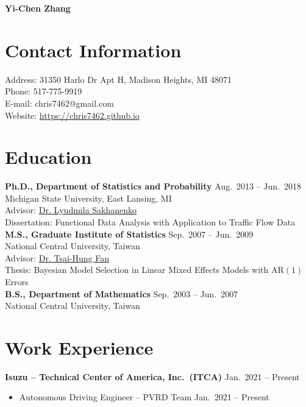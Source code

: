 \documentclass[a4paper,10pt,dvipdfmx]{article}
\begin{document}
\begin{center}
  {\huge \textbf{Yi-Chen Zhang}}
\end{center}

\section*{Contact Information}
\indent Address: 31350 Harlo Dr Apt H, Madison Heights, MI 48071\\
\indent Phone: 517-775-9919\\
\indent E-mail: chris7462@gmail.com\\
\indent Website: \href{https://chris7462.github.io}{https://chris7462.github.io}

\section*{Education}
\indent \textbf{Ph.D., Department of Statistics and Probability} \hfill Aug.~2013 -- Jun.~2018\\
\indent Michigan State University, East Lansing, MI\\
\indent Advisor: \href{https://www.stt.msu.edu/users/luda/}{Dr. Lyudmila Sakhanenko}\\
\indent Dissertation: Functional Data Analysis with Application to Traffic Flow Data\\

\indent \textbf{M.S., Graduate Institute of Statistics} \hfill Sep.~2007 -- Jun.~2009\\
\indent National Central University, Taiwan\\
\indent Advisor: \href{http://www.stat.ncu.edu.tw/teacher/THFan/index.htm}{Dr. Tsai-Hung Fan}\\
\indent Thesis: Bayesian Model Selection in Linear Mixed Effects Models with AR$(1)$ Errors\\

\indent \textbf{B.S., Department of Mathematics} \hfill Sep.~2003 -- Jun.~2007\\
\indent National Central University, Taiwan

\section*{Work Experience}
\textbf{Isuzu -- Technical Center of America, Inc.~(ITCA)} \hfill Jan.~2021 -- Present
\begin{itemize}[noitemsep,nolistsep]
	\item[] Autonomous Driving Engineer -- PVRD Team \hfill Jan.~2021 -- Present
\end{itemize}
\end{document}

